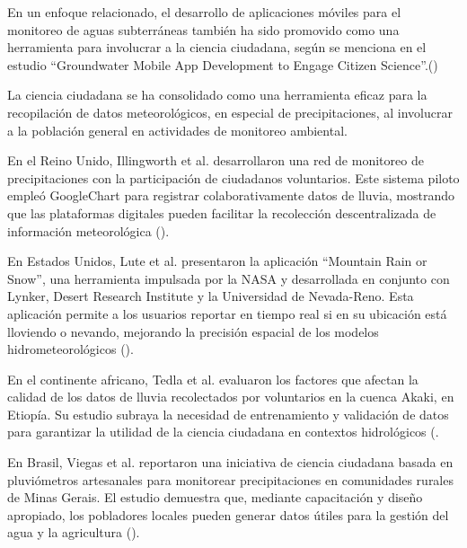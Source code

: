 En un enfoque relacionado, el desarrollo de aplicaciones móviles para el monitoreo de aguas subterráneas también ha sido promovido como una herramienta para involucrar a la ciencia ciudadana, según se menciona en el estudio ``Groundwater Mobile App Development to Engage Citizen Science''.(\cite{dennis2019groundwater})


















La ciencia ciudadana se ha consolidado como una herramienta eficaz para la recopilación de datos meteorológicos, en especial de precipitaciones, al involucrar a la población general en actividades de monitoreo ambiental.

En el Reino Unido, Illingworth et al. desarrollaron una red de monitoreo de precipitaciones con la participación de ciudadanos voluntarios. Este sistema piloto empleó GoogleChart para registrar colaborativamente datos de lluvia, mostrando que las plataformas digitales pueden facilitar la recolección descentralizada de información meteorológica  (\cite{illingworth2021ukprecipitation}).

En Estados Unidos, Lute et al. presentaron la aplicación ``Mountain Rain or Snow'', una herramienta impulsada por la NASA y desarrollada en conjunto con Lynker, Desert Research Institute y la Universidad de Nevada-Reno. Esta aplicación permite a los usuarios reportar en tiempo real si en su ubicación está lloviendo o nevando, mejorando la precisión espacial de los modelos hidrometeorológicos  (\cite{lute2021enhancing}).

En el continente africano, Tedla et al. evaluaron los factores que afectan la calidad de los datos de lluvia recolectados por voluntarios en la cuenca Akaki, en Etiopía. Su estudio subraya la necesidad de entrenamiento y validación de datos para garantizar la utilidad de la ciencia ciudadana en contextos hidrológicos  (\cite{tedla2022evaluation}.

En Brasil, Viegas et al. reportaron una iniciativa de ciencia ciudadana basada en pluviómetros artesanales para monitorear precipitaciones en comunidades rurales de Minas Gerais. El estudio demuestra que, mediante capacitación y diseño apropiado, los pobladores locales pueden generar datos útiles para la gestión del agua y la agricultura  (\cite{viegas2023citizen}).

